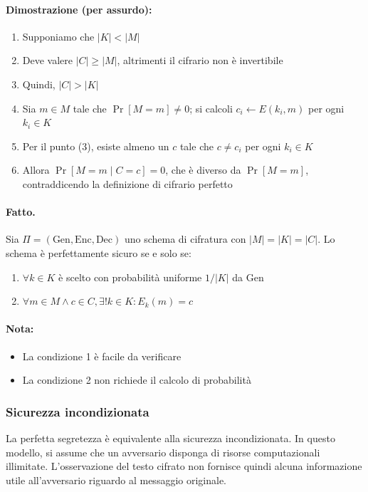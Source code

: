 \documentclass{report}
\begin{document}
  \paragraph{Dimostrazione (per assurdo):}
  \begin{enumerate}
      \item Supponiamo che $|K| < |M|$
      \item Deve valere $|C| \geq |M|$, altrimenti il cifrario non è invertibile
      \item Quindi, $|C| > |K|$
      \item Sia $m \in M$ tale che $\Pr[M = m] \neq 0$; si calcoli $c_i \leftarrow E(k_i, m)$ per ogni $k_i \in K$
      \item Per il punto (3), esiste almeno un $c$ tale che $c \neq c_i$ per ogni $k_i \in K$
      \item Allora $\Pr[M = m \mid C = c] = 0$, che è diverso da $\Pr[M = m]$, contraddicendo la definizione di cifrario perfetto
  \end{enumerate}
  
  \paragraph{Fatto.} Sia $\Pi = (\text{Gen}, \text{Enc}, \text{Dec})$ uno schema di cifratura con $|M| = |K| = |C|$. Lo schema è perfettamente sicuro se e solo se:
  \begin{enumerate}
      \item  $\forall k \in K$ è scelto con probabilità uniforme $1/|K|$ da Gen
      \item  $\forall m \in M \land c \in C, \exists! k \in K : E_k(m) = c$
  \end{enumerate}
  
  \paragraph{Nota:}
  \begin{itemize}
      \item La condizione 1 è facile da verificare
      \item La condizione 2 non richiede il calcolo di probabilità
  \end{itemize}
  
  \subsubsection{Sicurezza incondizionata}
  La perfetta segretezza è equivalente alla sicurezza incondizionata. In questo modello, si assume che un avversario disponga di risorse computazionali illimitate. L'osservazione del testo cifrato non fornisce quindi alcuna informazione utile all'avversario riguardo al messaggio originale.
  
\end{document}
